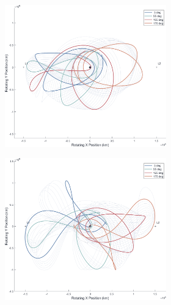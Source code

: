 \documentclass[letterpaper, paper,11pt]{AAS}	%
\begin{document}
\begin{figure}[h!]
    \begin{subfigure}{}
        \includegraphics[trim=70 50 0 0, clip, width=2.75in]{./figs/sunrot_ThetaPlot_io_famF_vInf0.3.png}
    \end{subfigure}
    \begin{subfigure}{}
        \includegraphics[trim=75 50 0 0, clip, width=2.75in]{./figs/sunrot_ThetaPlot_io_famF_vInf0.6.png}
    \end{subfigure}
\end{figure}
\end{document}
